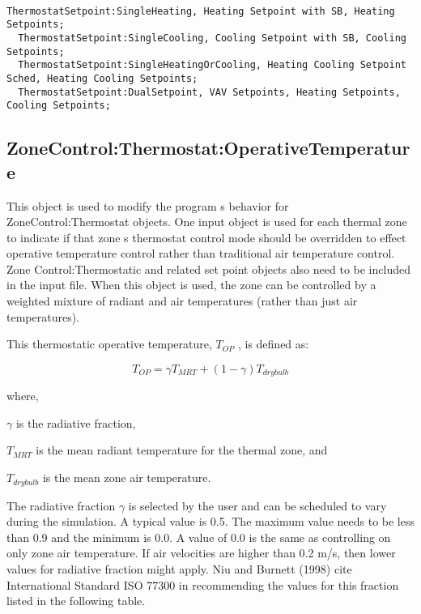 \begin{lstlisting}

ThermostatSetpoint:SingleHeating, Heating Setpoint with SB, Heating Setpoints;
  ThermostatSetpoint:SingleCooling, Cooling Setpoint with SB, Cooling Setpoints;
  ThermostatSetpoint:SingleHeatingOrCooling, Heating Cooling Setpoint Sched, Heating Cooling Setpoints;
  ThermostatSetpoint:DualSetpoint, VAV Setpoints, Heating Setpoints, Cooling Setpoints;
\end{lstlisting}

\subsection{ZoneControl:Thermostat:OperativeTemperature}\label{zonecontrolthermostatoperativetemperature}

This object is used to modify the program s behavior for ZoneControl:Thermostat objects. One input object is used for each thermal zone to indicate if that zone s thermostat control mode should be overridden to effect operative temperature control rather than traditional air temperature control. Zone Control:Thermostatic and related set point objects also need to be included in the input file. When this object is used, the zone can be controlled by a weighted mixture of radiant and air temperatures (rather than just air temperatures).

This thermostatic operative temperature, \({T_{OP}}\) , is defined as:

\begin{equation}
{T_{OP}} = \gamma {T_{MRT}} + (1 - \gamma ){T_{drybulb}}
\end{equation}

where,

\(\gamma\) is the radiative fraction,

\({T_{MRT}}\) is the mean radiant temperature for the thermal zone, and

\({T_{drybulb}}\) is the mean zone air temperature.

The radiative fraction \(\gamma\) is selected by the user and can be scheduled to vary during the simulation. A typical value is 0.5. The maximum value needs to be less than 0.9 and the minimum is 0.0. A value of 0.0 is the same as controlling on only zone air temperature. If air velocities are higher than 0.2 m/s, then lower values for radiative fraction might apply. Niu and Burnett (1998) cite International Standard ISO 77300 in recommending the values for this fraction listed in the following table.


